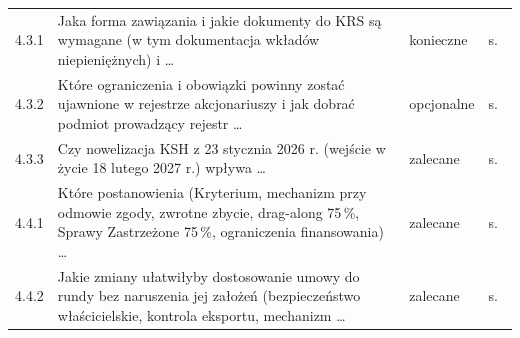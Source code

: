 \documentclass[12pt,a4paper]{report}
\begin{document}
{\begin{longtable}{@{}p{1.2cm} p{9.6cm} p{2.3cm} p{1.4cm}@{}}
4.3.1 & Jaka forma zawiązania i jakie dokumenty do KRS są wymagane (w tym dokumentacja wkładów niepieniężnych) i \ldots & konieczne & s.~\pageref{memo:4.3.1} \\
4.3.2 & Które ograniczenia i obowiązki powinny zostać ujawnione w rejestrze akcjonariuszy i jak dobrać podmiot prowadzący rejestr \ldots & opcjonalne & s.~\pageref{memo:4.3.2} \\
4.3.3 & Czy nowelizacja KSH z 23 stycznia 2026 r. (wejście w życie 18 lutego 2027 r.) wpływa \ldots & zalecane & s.~\pageref{memo:4.3.3} \\
4.4.1 & Które postanowienia (Kryterium, mechanizm przy odmowie zgody, zwrotne zbycie, drag-along 75\,\%, Sprawy Zastrzeżone 75\,\%, ograniczenia finansowania) \ldots & zalecane & s.~\pageref{memo:4.4.1} \\
4.4.2 & Jakie zmiany ułatwiłyby dostosowanie umowy do rundy bez naruszenia jej założeń (bezpieczeństwo właścicielskie, kontrola eksportu, mechanizm \ldots & zalecane & s.~\pageref{memo:4.4.2} \\
\bottomrule
\end{longtable}
}
\end{document}
